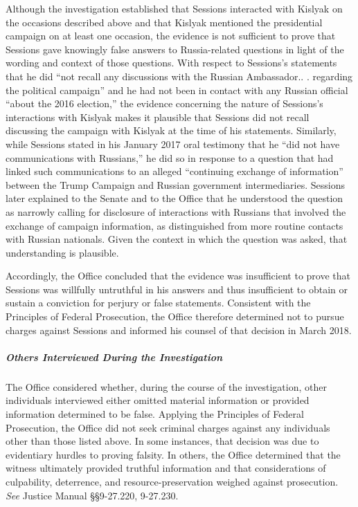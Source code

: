 Although the investigation established that Sessions interacted with Kislyak on the occasions described above and that Kislyak mentioned the presidential campaign on at least one occasion, the evidence is not sufficient to prove that Sessions gave knowingly false answers to Russia-related questions in light of the wording and context of those questions.
With respect to Sessions's statements that he did ``not recall any discussions with the Russian Ambassador.. . regarding the political campaign'' and he had not been in contact with any Russian official ``about the 2016 election,'' the evidence concerning the nature of Sessions's interactions with Kislyak makes it plausible that Sessions did not recall discussing the campaign with Kislyak at the time of his statements.
Similarly, while Sessions stated in his January 2017 oral testimony that he ``did not have communications with Russians,'' he did so in response to a question that had linked such communications to an alleged ``continuing exchange of information'' between the Trump Campaign and Russian government intermediaries.
Sessions later explained to the Senate and to the Office that he understood the question as narrowly calling for disclosure of interactions with Russians that involved the exchange of campaign information, as distinguished from more routine contacts with Russian nationals.
Given the context in which the question was asked, that understanding is plausible.

Accordingly, the Office concluded that the evidence was insufficient to prove that Sessions was willfully untruthful in his answers and thus insufficient to obtain or sustain a conviction for perjury or false statements.
Consistent with the Principles of Federal Prosecution, the Office therefore determined not to pursue charges against Sessions and informed his counsel of that decision in March 2018.

\subparagraph{Others Interviewed During the Investigation}
The Office considered whether, during the course of the investigation, other individuals interviewed either omitted material information or provided information determined to be false.
Applying the Principles of Federal Prosecution, the Office did not seek criminal charges against any individuals other than those listed above.
In some instances, that decision was due to evidentiary hurdles to proving falsity.
In others, the Office determined that the witness ultimately provided truthful information and that considerations of culpability, deterrence, and resource-preservation weighed against prosecution.
\textit{See} Justice Manual \S\S 9-27.220, 9-27.230.






